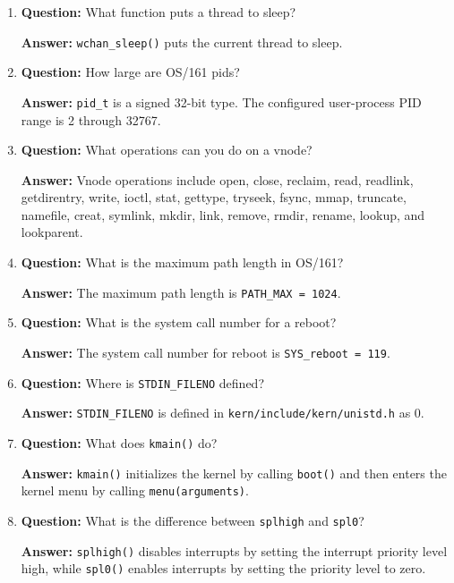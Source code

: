 \documentclass[11pt,a4paper]{article}
\begin{document}
\begin{enumerate}
    \textbf{Answer:} The standard filesystem interface is \texttt{struct fs}, which provides \texttt{fs\_sync}, \texttt{fs\_getvolname}, \texttt{fs\_getroot}, and \texttt{fs\_unmount}.

    \item \textbf{Question:} What function puts a thread to sleep?

    \textbf{Answer:} \texttt{wchan\_sleep()} puts the current thread to sleep.

    \item \textbf{Question:} How large are OS/161 pids?

    \textbf{Answer:} \texttt{pid\_t} is a signed 32-bit type. The configured user-process PID range is 2 through 32767.

    \item \textbf{Question:} What operations can you do on a vnode?

    \textbf{Answer:} Vnode operations include open, close, reclaim, read, readlink, getdirentry, write, ioctl, stat, gettype, tryseek, fsync, mmap, truncate, namefile, creat, symlink, mkdir, link, remove, rmdir, rename, lookup, and lookparent.

    \item \textbf{Question:} What is the maximum path length in OS/161?

    \textbf{Answer:} The maximum path length is \texttt{PATH\_MAX = 1024}.

    \item \textbf{Question:} What is the system call number for a reboot?

    \textbf{Answer:} The system call number for reboot is \texttt{SYS\_reboot = 119}.

    \item \textbf{Question:} Where is \texttt{STDIN\_FILENO} defined?

    \textbf{Answer:} \texttt{STDIN\_FILENO} is defined in \texttt{kern/include/kern/unistd.h} as 0.

    \item \textbf{Question:} What does \texttt{kmain()} do?

    \textbf{Answer:} \texttt{kmain()} initializes the kernel by calling \texttt{boot()} and then enters the kernel menu by calling \texttt{menu(arguments)}.

    \item \textbf{Question:} What is the difference between \texttt{splhigh} and \texttt{spl0}?

    \textbf{Answer:} \texttt{splhigh()} disables interrupts by setting the interrupt priority level high, while \texttt{spl0()} enables interrupts by setting the priority level to zero.


\end{enumerate}
\end{document}
